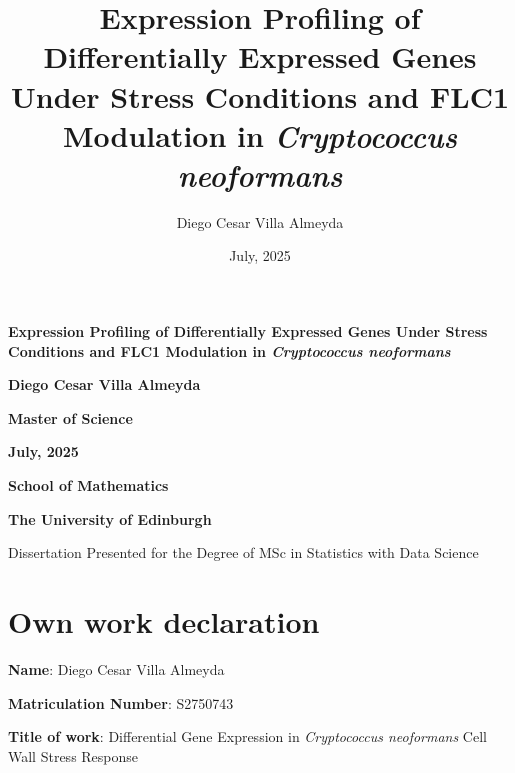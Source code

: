\documentclass[
  a4paper,
]{scrreprt}
\title{Expression Profiling of Differentially Expressed Genes Under
Stress Conditions and FLC1 Modulation in \emph{Cryptococcus neoformans}}
\author{Diego Cesar Villa Almeyda}
\date{July, 2025}
\renewcommand*\contentsname{Table of contents}
\newcommand\contentsname{Table of contents}
\begin{document}
\cleardoublepage
\thispagestyle{empty}
\vspace*{2cm}  %

\begin{center}
  {\huge\bfseries Expression Profiling of Differentially Expressed Genes
Under Stress Conditions and FLC1 Modulation in \emph{Cryptococcus
neoformans} \par}
    
  \vspace{6em}

    {\Large\bfseries Diego Cesar Villa Almeyda \par}
  
  \vspace{2em}
  {\bfseries\large Master of Science \par}
  
  \vspace{1.5em}
  {\bfseries\large July, 2025 \par}
  
  \vspace{4em}

      {\bfseries\large School of Mathematics \par}
    
  {\bfseries\large The University of Edinburgh \par}
      
  \vspace{6em}
  {\small Dissertation Presented for the Degree of MSc in Statistics with Data Science \par}
\end{center}

\renewcommand*\contentsname{Table of contents}
{
\hypersetup{linkcolor=}
\setcounter{tocdepth}{2}
\tableofcontents
}


\chapter*{Own work declaration}\label{own-work-declaration}


\textbf{Name}: Diego Cesar Villa Almeyda

\textbf{Matriculation Number}: S2750743

\textbf{Title of work}: Differential Gene Expression in
\emph{Cryptococcus neoformans} Cell Wall Stress Response
\end{document}
